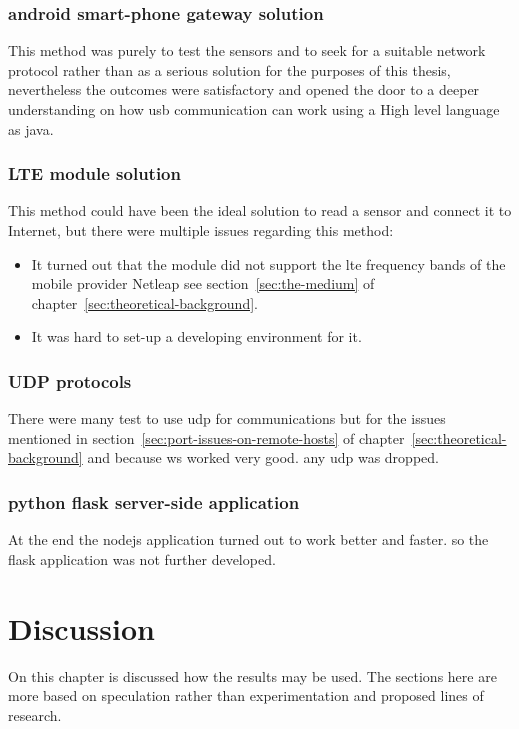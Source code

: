 \documentclass[hidelinks,11pt,a4paper,oneside,article]{memoir}
\begin{document}
\subsection{android smart-phone gateway solution}
This method was purely to test the sensors and to seek for a suitable network protocol rather than as a serious solution for the purposes of this thesis, nevertheless the outcomes were satisfactory and opened the door to a deeper understanding on how \gls{usb} communication can work using a High level language as \gls{java}.

\subsection{LTE module solution}
This method could have been the ideal solution to read a sensor and connect it to Internet, but there were multiple issues regarding this method:
\begin{itemize}
    \item It turned out that the module did not support the \gls{lte} frequency bands of the mobile provider Netleap see section~\ref{sec:the-medium} of chapter~\ref{sec:theoretical-background}.
    \item It was hard to set-up a developing environment for it.
\end{itemize} 

\subsection{UDP protocols}
There were many test to use \gls{udp} for communications but for the issues mentioned in section~\ref{sec:port-issues-on-remote-hosts} of chapter~\ref{sec:theoretical-background} and because \gls{ws} worked very good. any \gls{udp} was dropped.

\subsection{python flask server-side application}
At the end the \gls{nodejs} application turned out to work better and faster. so the flask application was not further developed.


\clearpage\chapter{Discussion}\label{sec:discussion}
On this chapter is discussed how the results may be used. The sections here are more based on speculation rather than experimentation and proposed lines of research.
\end{document}
